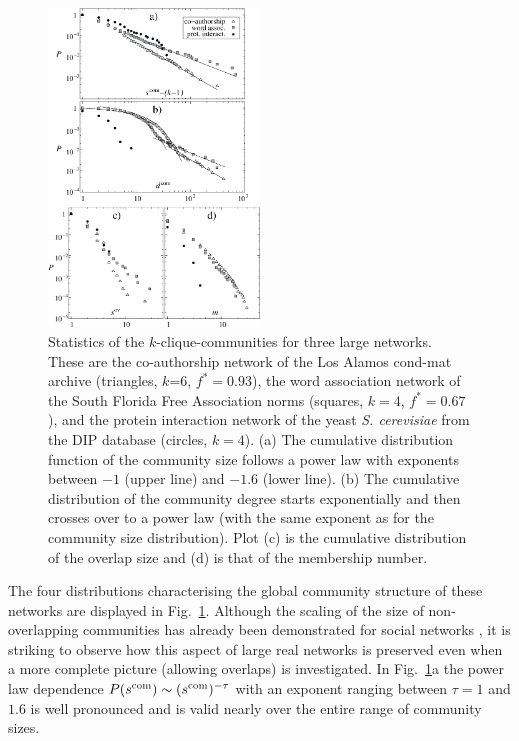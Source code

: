 \documentclass[11pt,a4paper]{article}
\begin{document}
\begin{figure}[!t]
\centerline{\includegraphics[width=0.5\textwidth]{vegso/statik_lapit}}
\caption{
Statistics of the $k$-clique-communities for three large networks.
These are the co-authorship network
of the Los Alamos cond-mat archive (triangles, $k$=6, $f^*=0.93$), the
word association network of the South Florida Free Association norms
(squares, $k=4$, $f^*=0.67$), and the protein interaction network of
the yeast \textit{S. cerevisiae} from the DIP database (circles, $k=4$).
(a) The cumulative distribution function of the community size follows a power
law with exponents between $-1$ (upper line) and $-1.6$ (lower line).
%
(b) The cumulative distribution of the community degree starts
exponentially and then crosses over to a power law (with the same
exponent as for the community size distribution).
%
Plot (c) is the cumulative distribution of the overlap size and
%
(d) is that of the membership number.
}
\label{fig:stats}
\end{figure}


The four distributions characterising the global community structure of
these networks are displayed in Fig.~\ref{fig:stats}.
Although the scaling of the size of non-overlapping communities has
already been demonstrated for social networks
\cite{newman-pre,radicchi-pnas},
it is striking to observe how this aspect of large real networks is
preserved even when a more complete picture (allowing overlaps)
is investigated. In Fig.~\ref{fig:stats}a the power law
dependence $P(s^{\rm com})\sim(s^{\rm com})^{-\tau}$ with an exponent ranging
between $\tau=1$ and $1.6$ is well pronounced and is valid
nearly over the entire range of community sizes. 
\end{document}
